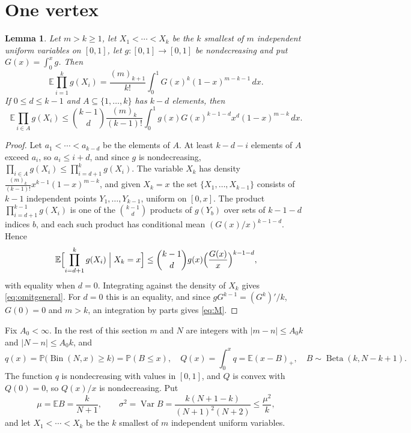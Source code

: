 \documentclass[11pt]{amsart}
\newtheorem{lemma}[theorem]{Lemma}
\theoremstyle{remark}
\numberwithin{equation}{section}
\newcommand{\E}{\mathbb E}
\newcommand{\Pp}{\mathbb P}
\newcommand{\Bin}{\operatorname{Bin}}
\newcommand{\Bet}{\operatorname{Beta}}
\newcommand{\1}{\mathbf 1}
\begin{document}
\section{One vertex}\label{sec:one}

\begin{lemma}\label{lem:ordstat}
Let $m>k\ge1$, let $X_1<\cdots<X_k$ be the $k$ smallest of $m$ independent uniform variables on $[0,1]$, let $g\colon[0,1]\to[0,1]$ be nondecreasing and put $G(x)=\int_0^xg$. Then
\begin{equation}\label{eq:M}
\E\prod_{i=1}^kg(X_i)=\frac{(m)_{k+1}}{k!}\int_0^1G(x)^k(1-x)^{m-k-1}\,dx .
\end{equation}
If $0\le d\le k-1$ and $A\subseteq\{1,\dots,k\}$ has $k-d$ elements, then
\begin{equation}\label{eq:omitgeneral}
\E\prod_{i\in A}g(X_i)\le\binom{k-1}{d}\frac{(m)_k}{(k-1)!}\int_0^1g(x)G(x)^{k-1-d}x^d(1-x)^{m-k}\,dx .
\end{equation}
\end{lemma}

\begin{proof}
Let $a_1<\cdots<a_{k-d}$ be the elements of $A$. At least $k-d-i$ elements of $A$ exceed $a_i$, so $a_i\le i+d$, and since $g$ is nondecreasing, $\prod_{i\in A}g(X_i)\le\prod_{i=d+1}^kg(X_i)$. The variable $X_k$ has density $\frac{(m)_k}{(k-1)!}x^{k-1}(1-x)^{m-k}$, and given $X_k=x$ the set $\{X_1,\dots,X_{k-1}\}$ consists of $k-1$ independent points $Y_1,\dots,Y_{k-1}$, uniform on $[0,x]$. The product $\prod_{i=d+1}^{k-1}g(X_i)$ is one of the $\binom{k-1}{d}$ products of $g(Y_b)$ over sets of $k-1-d$ indices $b$, and each such product has conditional mean $(G(x)/x)^{k-1-d}$. Hence
\[
\E\Bigl[\prod_{i=d+1}^kg(X_i)\Bigm|X_k=x\Bigr]\le\binom{k-1}{d}g(x)\Bigl(\frac{G(x)}x\Bigr)^{k-1-d},
\]
with equality when $d=0$. Integrating against the density of $X_k$ gives \eqref{eq:omitgeneral}. For $d=0$ this is an equality, and since $gG^{k-1}=(G^k)'/k$, $G(0)=0$ and $m>k$, an integration by parts gives \eqref{eq:M}.
\end{proof}

Fix $A_0<\infty$. In the rest of this section $m$ and $N$ are integers with $|m-n|\le A_0k$ and $|N-n|\le A_0k$, and
\[
q(x)=\Pp\bigl(\Bin(N,x)\ge k\bigr)=\Pp(B\le x),\quad Q(x)=\int_0^xq=\E(x-B)_+,\quad B\sim\Bet(k,N-k+1).
\]
The function $q$ is nondecreasing with values in $[0,1]$, and $Q$ is convex with $Q(0)=0$, so $Q(x)/x$ is nondecreasing. Put
\[
\mu=\E B=\frac k{N+1},\qquad\sigma^2=\operatorname{Var}B=\frac{k(N+1-k)}{(N+1)^2(N+2)}\le\frac{\mu^2}k ,
\]
and let $X_1<\cdots<X_k$ be the $k$ smallest of $m$ independent uniform variables.
\end{document}
